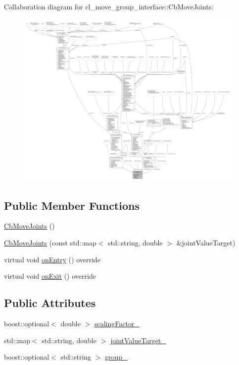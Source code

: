 Collaboration diagram for cl\+\_\+move\+\_\+group\+\_\+interface\+:\+:Cb\+Move\+Joints\+:
\nopagebreak
\begin{figure}[H]
\begin{center}
\leavevmode
\includegraphics[width=350pt]{classcl__move__group__interface_1_1CbMoveJoints__coll__graph}
\end{center}
\end{figure}
\subsection*{Public Member Functions}
\begin{DoxyCompactItemize}
\item 
\hyperlink{classcl__move__group__interface_1_1CbMoveJoints_a085919fd766e50098cbe9782de3303c6}{Cb\+Move\+Joints} ()
\item 
\hyperlink{classcl__move__group__interface_1_1CbMoveJoints_a3b79fb14e34ffdb5cd6ffafdaa6b8965}{Cb\+Move\+Joints} (const std\+::map$<$ std\+::string, double $>$ \&joint\+Value\+Target)
\item 
virtual void \hyperlink{classcl__move__group__interface_1_1CbMoveJoints_a23e4181af695aed9fa6bb4ae3f17fd76}{on\+Entry} () override
\item 
virtual void \hyperlink{classcl__move__group__interface_1_1CbMoveJoints_aff7d27d2427a5a771cb9abce1609aa27}{on\+Exit} () override
\end{DoxyCompactItemize}
\subsection*{Public Attributes}
\begin{DoxyCompactItemize}
\item 
boost\+::optional$<$ double $>$ \hyperlink{classcl__move__group__interface_1_1CbMoveJoints_a2480db16c4bf55a40701c00cd2afe9a0}{scaling\+Factor\+\_\+}
\item 
std\+::map$<$ std\+::string, double $>$ \hyperlink{classcl__move__group__interface_1_1CbMoveJoints_a8103f7c923a34d9bf5a2c374ff88a277}{joint\+Value\+Target\+\_\+}
\item 
boost\+::optional$<$ std\+::string $>$ \hyperlink{classcl__move__group__interface_1_1CbMoveJoints_afc75b1e5403e49583930531bcb6508eb}{group\+\_\+}
\end{DoxyCompactItemize}
